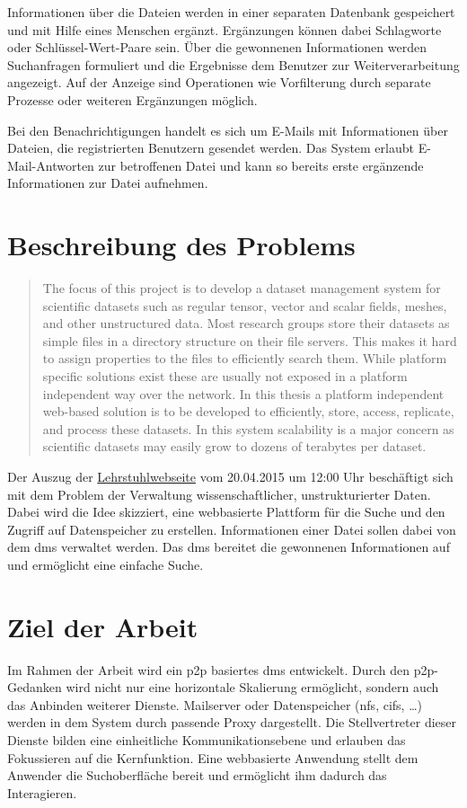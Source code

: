 \documentclass[oneside, ngerman, toc=bibliography,bibliography=totoc,listof=entryprefix, open=right,numbers=noenddot,fontsize=12pt]{scrbook}
\begin{document}
Informationen über die Dateien werden in einer separaten Datenbank gespeichert und mit Hilfe eines Menschen ergänzt. Ergänzungen können dabei Schlagworte oder Schlüssel-Wert-Paare sein. Über die gewonnenen Informationen werden Suchanfragen formuliert und die Ergebnisse dem Benutzer zur Weiterverarbeitung angezeigt. Auf der Anzeige sind Operationen wie Vorfilterung durch separate Prozesse oder weiteren Ergänzungen möglich.

Bei den Benachrichtigungen handelt es sich um E-Mails mit Informationen über Dateien, die registrierten Benutzern gesendet werden. Das System erlaubt E-Mail-Antworten zur betroffenen Datei und kann so bereits erste ergänzende Informationen zur Datei aufnehmen.


\section{Beschreibung des Problems}


\begin{quote}
The focus of this project is to develop a dataset management system for scientific datasets such as regular tensor, vector and scalar fields, meshes, and other unstructured data.
Most research groups store their datasets as simple files in a directory structure on their file servers. This makes it hard to assign properties to the files to efficiently search them. While platform specific solutions exist these are usually not exposed in a platform independent way over the network.
In this thesis a platform independent web-based solution is to be developed to efficiently, store, access, replicate, and process these datasets. In this system scalability is a major concern as scientific datasets may easily grow to dozens of terabytes per dataset. 
\end{quote}


Der Auszug der \href{http://hpc.uni-due.de/theses.html}{Lehrstuhlwebseite} vom 20.04.2015 um 12:00 Uhr beschäftigt sich mit dem Problem der Verwaltung wissenschaftlicher, unstrukturierter Daten. Dabei wird die Idee skizziert, eine webbasierte Plattform für die Suche und den Zugriff auf Datenspeicher zu erstellen. Informationen einer Datei sollen dabei von dem  \acrfull{dms} verwaltet werden. Das \acrshort{dms} bereitet die gewonnenen Informationen auf und ermöglicht eine einfache Suche.

\section{Ziel der Arbeit}
Im Rahmen der Arbeit wird ein  \acrfull{p2p}  basiertes \acrshort{dms} entwickelt. Durch den \acrshort{p2p}-Gedanken wird nicht nur eine horizontale Skalierung ermöglicht, sondern auch das Anbinden weiterer Dienste. Mailserver oder Datenspeicher (\acrfull{nfs}, \acrfull{cifs}, \ldots) werden in dem System durch passende Proxy dargestellt. Die Stellvertreter dieser Dienste bilden eine einheitliche Kommunikationsebene \cite{coulouris2002verteilte} und erlauben das Fokussieren auf die Kernfunktion. Eine webbasierte Anwendung stellt dem Anwender die Suchoberfläche bereit und ermöglicht ihm dadurch das Interagieren.
\end{document}
